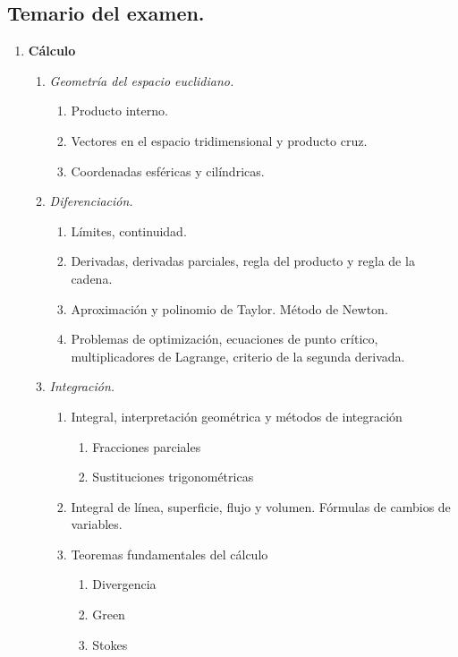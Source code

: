 \documentclass[10pt,a4paper]{article}
\begin{document}
\subsection{Temario del examen.}
\begin{enumerate}
	\item \textbf{Cálculo}
	\begin{enumerate}
		\item \textit{Geometría del espacio euclidiano.}
		\begin{enumerate}
			\item Producto interno.
			\item Vectores en el espacio tridimensional y producto cruz.
			\item Coordenadas esféricas y cilíndricas.
		\end{enumerate}
		\item \textit{Diferenciación.}
		\begin{enumerate}
			\item Límites, continuidad.
			\item Derivadas, derivadas parciales, regla del producto y regla de la cadena.
			\item Aproximación y polinomio de Taylor. Método de Newton.
			\item Problemas de optimización, ecuaciones de punto crítico, multiplicadores de Lagrange, criterio de la segunda derivada.
		\end{enumerate}
		\item \textit{Integración.}
		\begin{enumerate}
			\item Integral, interpretación geométrica y métodos de integración
			\begin{enumerate}
				\item Fracciones parciales
				\item Sustituciones trigonométricas
			\end{enumerate}
			\item Integral de línea, superficie, flujo y volumen. Fórmulas de cambios de variables.	 
			\item Teoremas fundamentales del cálculo
			\begin{enumerate}
				\item Divergencia
				\item Green
				\item Stokes
			\end{enumerate}
		\end{enumerate}
	\end{enumerate}

\end{enumerate}
\end{document}
